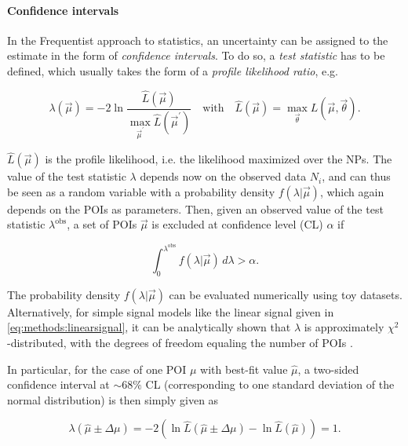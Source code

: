 \paragraph{Confidence intervals}

In the Frequentist approach to statistics, an uncertainty can be assigned to the estimate in the form of \textit{confidence intervals}. To do so, a \textit{test statistic} has to be defined, which usually takes the form of a \textit{profile likelihood ratio}, e.g.

\begin{equation}
\label{eq:methods:teststat}
    \lambda (\vec{\mu}) = - 2 \ln \frac { \hat{L} (\vec{\mu}) } { \max_{\vec{\mu}^\prime} \hat{L} (\vec{\mu}^\prime) } 
    \quad \text{with} \quad 
    \hat{L} (\vec{\mu}) = \max_{\vec{\theta}} L (\vec{\mu}, \vec{\theta}).
\end{equation}

$\hat{L} (\vec{\mu})$ is the profile likelihood, i.e. the likelihood maximized over the NPs. The value of the test statistic $\lambda$ depends now on the observed data $N_i$, and can thus be seen as a random variable with a probability density $f(\lambda | \vec{\mu})$, which again depends on the POIs as parameters. Then, given an observed value of the test statistic $\lambda^{\mathrm{obs}}$, a set of POIs $\vec{\mu}$ is excluded at confidence level (CL) $\alpha$ if 

\begin{equation}
\label{eq:methods:cl}
    \int_0^{\lambda^{\mathrm{obs}}} f(\lambda | \vec{\mu}) \, d\lambda > \alpha.
\end{equation}

The probability density $f(\lambda | \vec{\mu})$ can be evaluated numerically using toy datasets. Alternatively, for simple signal models like the linear signal given in \cref{eq:methods:linearsignal}, it can be analytically shown that $\lambda$ is approximately $\chi^2$-distributed, with the degrees of freedom equaling the number of POIs .%

In particular, for the case of one POI $\mu$ with best-fit value $\hat{\mu}$, a two-sided confidence interval at $\sim 68\%$ CL (corresponding to one standard deviation of the normal distribution) is then simply given as

\begin{equation}
    \lambda(\hat{\mu} \pm \Delta \mu) = -2 (\ln \hat{L} (\hat{\mu} \pm \Delta \mu) - \ln \hat{L} (\hat{\mu})) = 1.
\end{equation}

